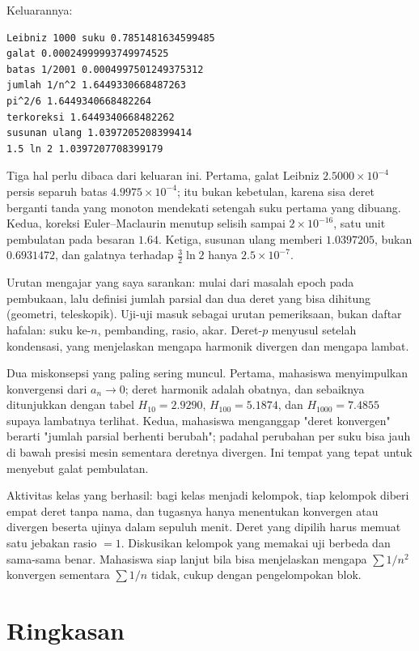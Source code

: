 Keluarannya:
\begin{verbatim}
Leibniz 1000 suku 0.7851481634599485
galat 0.00024999993749974525
batas 1/2001 0.0004997501249375312
jumlah 1/n^2 1.6449330668487263
pi^2/6 1.6449340668482264
terkoreksi 1.6449340668482262
susunan ulang 1.0397205208399414
1.5 ln 2 1.0397207708399179
\end{verbatim}

Tiga hal perlu dibaca dari keluaran ini. Pertama, galat Leibniz $2.5000 \times
10^{-4}$ persis separuh batas $4.9975 \times 10^{-4}$; itu bukan kebetulan, karena
sisa deret berganti tanda yang monoton mendekati setengah suku pertama yang dibuang.
Kedua, koreksi Euler--Maclaurin menutup selisih sampai $2 \times 10^{-16}$, satu unit
pembulatan pada besaran $1.64$. Ketiga, susunan ulang memberi $1.0397205$, bukan
$0.6931472$, dan galatnya terhadap $\tfrac{3}{2}\ln 2$ hanya $2.5 \times 10^{-7}$.

\begin{untukdosen}
Urutan mengajar yang saya sarankan: mulai dari masalah epoch pada pembukaan, lalu
definisi jumlah parsial dan dua deret yang bisa dihitung (geometri, teleskopik).
Uji-uji masuk sebagai urutan pemeriksaan, bukan daftar hafalan: suku ke-$n$, pembanding,
rasio, akar. Deret-$p$ menyusul setelah kondensasi, yang menjelaskan mengapa harmonik
divergen dan mengapa lambat.

Dua miskonsepsi yang paling sering muncul. Pertama, mahasiswa menyimpulkan
konvergensi dari $a_n \to 0$; deret harmonik adalah obatnya, dan sebaiknya
ditunjukkan dengan tabel $H_{10} = 2.9290$, $H_{100} = 5.1874$, dan
$H_{1000} = 7.4855$ supaya lambatnya terlihat.
Kedua, mahasiswa menganggap "deret konvergen" berarti "jumlah parsial berhenti
berubah"; padahal perubahan per suku bisa jauh di bawah presisi mesin sementara
deretnya divergen. Ini tempat yang tepat untuk menyebut galat pembulatan.

Aktivitas kelas yang berhasil: bagi kelas menjadi kelompok, tiap kelompok diberi
empat deret tanpa nama, dan tugasnya hanya menentukan konvergen atau divergen
beserta ujinya dalam sepuluh menit. Deret yang dipilih harus memuat satu jebakan
rasio $=1$. Diskusikan kelompok yang memakai uji berbeda dan sama-sama benar.
Mahasiswa siap lanjut bila bisa menjelaskan mengapa $\sum 1/n^2$ konvergen sementara
$\sum 1/n$ tidak, cukup dengan pengelompokan blok.
\end{untukdosen}

\section{Ringkasan}

